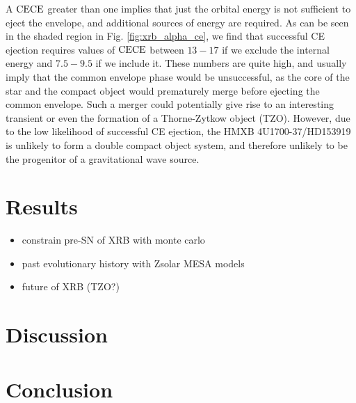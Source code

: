 \documentclass[linenumbers,trackchanges,twocolumn]{aastex701}
\begin{document}
 A $\alpha_{\rm CE}$ greater than one implies that just the orbital energy is not sufficient to eject the envelope, and additional sources of energy are required. As can be seen in the shaded region in Fig. \ref{fig:xrb_alpha_ce}, we find that successful CE ejection requires values of $\alpha_{\rm CE}$ between $13-17$ if we exclude the internal energy and $7.5-9.5$ if we include it. These numbers are quite high, and usually imply that the common envelope phase would be unsuccessful, as the core of the star and the compact object would prematurely merge before ejecting the common envelope. Such a merger could potentially give rise to an interesting transient or even the formation of a Thorne-Zytkow object (TZO). However, due to the low likelihood of successful CE ejection, the HMXB 4U1700-37/HD153919 is unlikely to form a double compact object system, and therefore unlikely to be the progenitor of a gravitational wave source.

\section{Results} \label{sec:floats}
\begin{itemize}
    \item constrain pre-SN of XRB with monte carlo
    \item past evolutionary history with Zsolar MESA models
    \item future of XRB (TZO?)
\end{itemize}

\section{Discussion} \label{sec:highlight}

\section{Conclusion} \label{sec:cite}


\begin{acknowledgments}

\end{acknowledgments}
\end{document}
